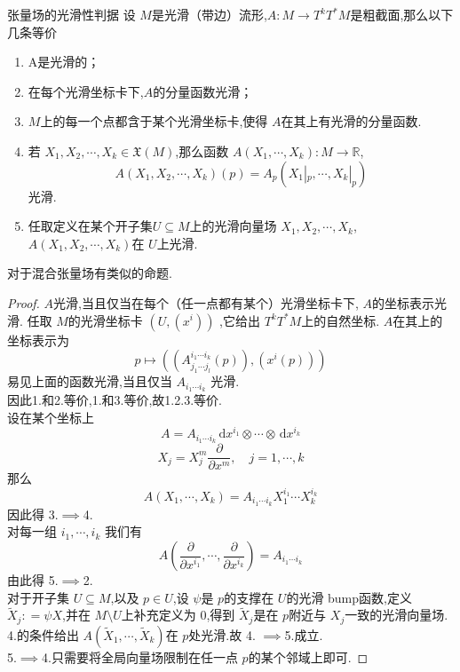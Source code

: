 \documentclass[../../几何与拓扑.tex]{subfiles}
\begin{document}
\begin{proposition}{张量场的光滑性判据}\label{pro:tensor-smoothness}
    设 $ M $是光滑（带边）流形,$ A:M\to T^{k}T^{*}M $是粗截面,那么以下几条等价
    \begin{enumerate}
        \item A是光滑的；
        \item 在每个光滑坐标卡下,$ A $的分量函数光滑；
        \item $ M $上的每一个点都含于某个光滑坐标卡,使得 $ A $在其上有光滑的分量函数.  
        \item 若 $ X_1,X_2,\cdots,X_k\in \mathfrak{X} \left( M \right) $,那么函数 $ A\left( X_1,\cdots ,X_{k} \right):M\to \mathbb{R}   $, $$
        A\left( X_1,X_2,\cdots,X_k   \right)\left( p \right)= A_{p}\left( X_{1}|_{p},\cdots ,X_{k}|_{p} \right)   
        $$光滑.
        \item 任取定义在某个开子集$U \subseteq M $上的光滑向量场 $ X_1,X_2,\cdots,X_k $,$ A\left( X_1,X_2,\cdots,X_k \right)  $在 $ U $上光滑.         
    \end{enumerate}
      
\end{proposition}
\begin{remark}
    对于混合张量场有类似的命题.
\end{remark}
\begin{proof}
    $ A $光滑,当且仅当在每个（任一点都有某个）光滑坐标卡下, $ A $的坐标表示光滑.
    任取 $ M $的光滑坐标卡 $ \left( U,\left( x^{i} \right)  \right)  $   ,它给出 $ T^{k}T^{*}M $上的自然坐标. $ A $在其上的坐标表示为 $$
  p\mapsto  \left(  \left( A^{i_1\cdots i_{k}}_{j_1\cdots j_{l}}\left( p \right)  \right) ,\left( x^{i} \left( p \right)\right)   \right) 
    $$ 易见上面的函数光滑,当且仅当 $ A_{i_1\cdots i_{k}} $  光滑.\\ 
     因此1.和2.等价,1.和3.等价,故1.2.3.等价.\\ 
      设在某个坐标上 $$
      A= A_{i_1\cdots i_{k}}\,\mathrm{d} x^{i_1}\otimes \cdots \otimes \,\mathrm{d} x^{i_{k}}
      $$ $$
      X_{j}= X_{j}^{m} \frac{\partial }{\partial x^{m}},\quad j=1,\cdots ,k
      $$那么 $$
      A\left( X_1,\cdots ,X_{k} \right)=  A_{i_1\cdots i_{k}} X_{1}^{i_1}\cdots X_{k}^{i_{k}}
      $$因此得 3.$ \implies $4. \\ 
       对每一组 $ i_1,\cdots ,i_{k} $ 我们有 $$
      A\left( \frac{\partial }{\partial x^{i_1}},\cdots ,\frac{\partial }{\partial x^{i_{k}}} \right)= A_{i_1\cdots i_{k}} 
      $$由此得 5.$\implies  $2. \\ 
       对于开子集 $ U\subseteq M $,以及 $ p \in U $,设 $ \psi $是 $ p $的支撑在 $ U $的光滑 bump函数,定义 $ \tilde{X}_{j}: = \psi X $,并在 $ M \setminus U $上补充定义为 $ 0 $,得到 $ \tilde{X}_{j} $是在 $ p $附近与 $ X_{j} $一致的光滑向量场.
       4.的条件给出 $ A\left( \tilde{X}_{1},\cdots ,\tilde{X}_{k} \right)  $在 $ p $处光滑.故 4. $ \implies $5.成立.\\ 
        5.$ \implies $4.只需要将全局向量场限制在任一点 $ p $的某个邻域上即可.                  
\end{proof}
\end{document}
